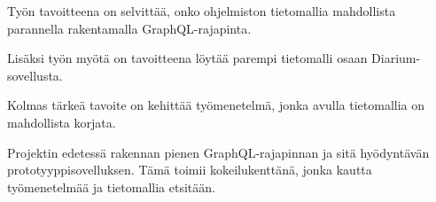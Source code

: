 Työn tavoitteena on selvittää, onko ohjelmiston tietomallia mahdollista
parannella rakentamalla GraphQL-rajapinta.

Lisäksi työn myötä on tavoitteena löytää parempi tietomalli osaan
Diarium-sovellusta.

Kolmas tärkeä tavoite on kehittää työmenetelmä, jonka avulla tietomallia
on mahdollista korjata.

Projektin edetessä rakennan pienen GraphQL-rajapinnan ja sitä
hyödyntävän prototyyppisovelluksen. Tämä toimii kokeilukenttänä, jonka
kautta työmenetelmää ja tietomallia etsitään.

